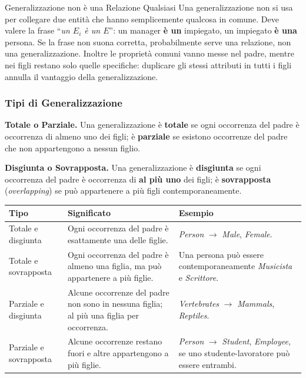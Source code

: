 \documentclass[12pt]{extarticle}
\begin{document}

\begin{cbox}{Generalizzazione non è una Relazione Qualsiasi}
\noindent Una generalizzazione non si usa per collegare due entità che hanno semplicemente qualcosa in comune. Deve valere la frase ``\textit{un $E_i$ è un $E$}'': un manager \textbf{è un} impiegato, un impiegato \textbf{è una} persona. Se la frase non suona corretta, probabilmente serve una relazione, non una generalizzazione. Inoltre le proprietà comuni vanno messe nel padre, mentre nei figli restano solo quelle specifiche: duplicare gli stessi attributi in tutti i figli annulla il vantaggio della generalizzazione.
\end{cbox}

\subsubsection{Tipi di Generalizzazione}

\noindent \textbf{Totale o Parziale.} Una generalizzazione è \textbf{totale} se ogni occorrenza del padre è occorrenza di almeno uno dei figli; è \textbf{parziale} se esistono occorrenze del padre che non appartengono a nessun figlio.

\medskip
\noindent \textbf{Disgiunta o Sovrapposta.} Una generalizzazione è \textbf{disgiunta} se ogni occorrenza del padre è occorrenza di \textbf{al più uno} dei figli; è \textbf{sovrapposta} (\textit{overlapping}) se può appartenere a più figli contemporaneamente.

\begin{center}
\small
\begin{tabular}{@{}L{3.4cm}L{6.8cm}L{5.6cm}@{}}
    \toprule
    \textbf{Tipo} & \textbf{Significato} & \textbf{Esempio} \\
    \midrule
    Totale e disgiunta & Ogni occorrenza del padre è esattamente una delle figlie. & \textit{Person} $\to$ \textit{Male}, \textit{Female}. \\
    \addlinespace
    Totale e sovrapposta & Ogni occorrenza del padre è almeno una figlia, ma può appartenere a più figlie. & Una persona può essere contemporaneamente \textit{Musicista} e \textit{Scrittore}. \\
    \addlinespace
    Parziale e disgiunta & Alcune occorrenze del padre non sono in nessuna figlia; al più una figlia per occorrenza. & \textit{Vertebrates} $\to$ \textit{Mammals}, \textit{Reptiles}. \\
    \addlinespace
    Parziale e sovrapposta & Alcune occorrenze restano fuori e altre appartengono a più figlie. & \textit{Person} $\to$ \textit{Student}, \textit{Employee}, se uno studente-lavoratore può essere entrambi. \\
    \bottomrule
\end{tabular}
\end{center}
\end{document}

